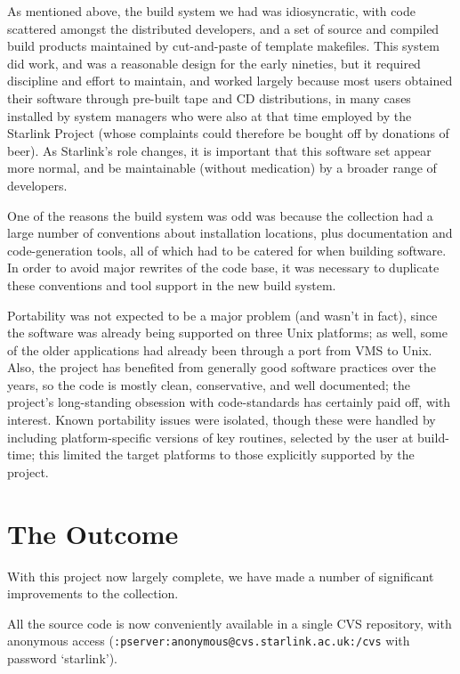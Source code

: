 \documentclass{speauth}
\begin{document}
As mentioned above, the build system we had was idiosyncratic, with
code scattered amongst the distributed developers, and a set of source
and compiled build products maintained by cut-and-paste of template
makefiles.  This system did work, and was a reasonable design for the
early nineties, but it required discipline and effort to maintain, and
worked largely because most users obtained their software through
pre-built tape and CD distributions, in many cases installed by system
managers who were also at that time employed by the Starlink Project
(whose complaints could therefore be bought off by donations of beer).
As Starlink's role changes, it is important that this software set
appear more normal, and be maintainable (without medication) by a
broader range of developers.

One of the reasons the build system was odd was because the collection
had a large number of conventions about installation locations, plus
documentation and code-generation tools, all of which had to be
catered for when building software.  In order to avoid major rewrites
of the code base, it was necessary to duplicate these conventions and
tool support in the new build system.

Portability was not expected to be a major problem (and wasn't in
fact), since the software was already being supported on three Unix
platforms; as well, some of the older applications had already been
through a port from VMS to Unix.  Also, the project has benefited from
generally good software practices over the years, so the code is
mostly clean, conservative, and well documented; the project's
long-standing obsession with code-standards has certainly paid off,
with interest.  Known portability issues were isolated, though these
were handled by including platform-specific versions of key routines,
selected by the user at build-time; this limited the target platforms
to those explicitly supported by the project.




\section{The Outcome}
\label{s:result}

With this project now largely complete, we have made a number of
significant improvements to the collection.

All the source code is now conveniently available in a single CVS
repository, with anonymous access
(\texttt{:pserver:anonymous@cvs.starlink.ac.uk:/cvs} with password `starlink').
\end{document}
